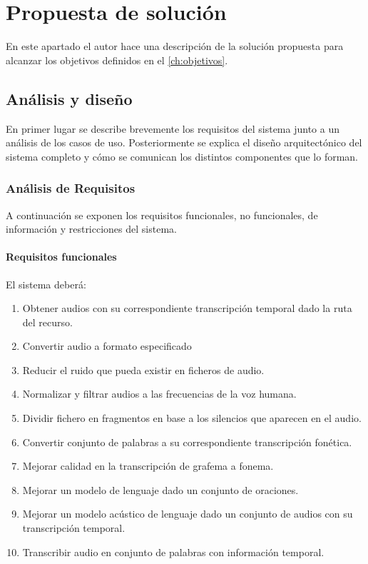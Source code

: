 \documentclass[../main.tex]{subfiles}
\begin{document}
\chapter{Propuesta de solución}\label{ch:propuesta_solucion}
En este apartado el autor hace una descripción de la solución propuesta para alcanzar los objetivos definidos en el \autoref{ch:objetivos}.

\section{Análisis y diseño}\label{sec:analisis_diseno}
En primer lugar se describe brevemente los requisitos del sistema junto a un análisis de los casos de uso. Posteriormente se explica el diseño arquitectónico del sistema completo y cómo se comunican los distintos componentes que lo forman.

\subsection{Análisis de Requisitos}\label{subsec:analisis_requisitos}
A continuación se exponen los requisitos funcionales, no funcionales, de información y restricciones del sistema.

\subsubsection{Requisitos funcionales}\label{subsubsec:req_funcionales}
El sistema deberá:

\begin{enumerate}
    \item Obtener audios con su correspondiente transcripción temporal dado la ruta del recurso.
    \item Convertir audio a formato especificado
    \item Reducir el ruido que pueda existir en ficheros de audio.
    \item Normalizar y filtrar audios a las frecuencias de la voz humana.
    \item Dividir fichero en fragmentos en base a los silencios que aparecen en el audio.
    \item Convertir conjunto de palabras a su correspondiente transcripción fonética.
    \item Mejorar calidad en la transcripción de grafema a fonema.
    \item Mejorar un modelo de lenguaje dado un conjunto de oraciones.
    \item Mejorar un modelo acústico de lenguaje dado un conjunto de audios con su transcripción temporal.
    \item Transcribir audio en conjunto de palabras con información temporal.
\end{enumerate}
\end{document}
